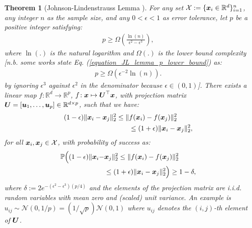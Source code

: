 \documentclass{article}
\newtheorem{theorem}{Theorem}
\def\b{\ensuremath\boldsymbol}
\begin{document}
\begin{theorem}[Johnson-Lindenstrauss Lemma \cite{johnson1984extensions}]\label{theorem_JL_lemma}
For any set $\mathcal{X} := \{\b{x}_i \in \mathbb{R}^d\}_{i=1}^n$, any integer $n$ as the sample size, and any $0<\epsilon<1$ as error tolerance, let $p$ be a positive integer satisfying:
\begin{align}\label{equation_JL_lemma_p_lower_bound}
p \geq \Omega(\frac{\ln(n)}{\epsilon^2 - \epsilon^3}),
\end{align}
where $\ln(.)$ is the natural logarithm and $\Omega(.)$ is the lower bound complexity [n.b. some works state Eq. (\ref{equation_JL_lemma_p_lower_bound}) as:
\begin{align}\label{equation_JL_lemma_p_lower_bound_relaxed}
p \geq \Omega(\epsilon^{-2} \ln(n)).
\end{align}
by ignoring $\epsilon^3$ against $\epsilon^2$ in the denominator because $\epsilon \in (0,1)$]. 
There exists a linear map $f\!: \mathbb{R}^d \rightarrow \mathbb{R}^p$, $f\!: \b{x} \mapsto \b{U}^\top \b{x}$, with projection matrix $\b{U} = [\b{u}_1, \dots, \b{u}_p] \in \mathbb{R}^{d \times p}$, such that we have:
\begin{equation}\label{equation_JL_lemma_correct_projection}
\begin{aligned}
(1 - \epsilon) \|\b{x}_i - \b{x}_j\|_2^2 \leq \|&f(\b{x}_i) - f(\b{x}_j)\|_2^2 \\
&\leq (1 + \epsilon) \|\b{x}_i - \b{x}_j\|_2^2,
\end{aligned}
\end{equation}
for all $\b{x}_i, \b{x}_j \in \mathcal{X}$, with probability of success as:
\begin{align}\label{equation_random_projection_prob_success}
\mathbb{P}\Big(
(1 - \epsilon) \|\b{x}_i - &\b{x}_j\|_2^2 \leq \|f(\b{x}_i) - f(\b{x}_j)\|_2^2 \nonumber \\
&\leq (1 + \epsilon) \|\b{x}_i - \b{x}_j\|_2^2 
\Big) \geq 1 - \delta,
\end{align}
where $\delta := 2 e^{-(\epsilon^2 - \epsilon^3) (p/4)}$ and the elements of the projection matrix are i.i.d. random variables with mean zero and (scaled) unit variance. An example is $u_{ij} \sim \mathcal{N}(0, 1/p) = (1/\sqrt{p}) \mathcal{N}(0, 1)$ where $u_{ij}$ denotes the $(i,j)$-th element of $\b{U}$. 
\end{theorem}
\end{document}
